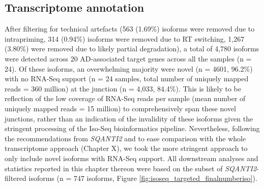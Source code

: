 
\clearpage
\subsection{Transcriptome annotation}
After filtering for technical artefacts (563 (1.69\%) isoforms were removed due to intrapriming, 314 (0.94\%) isoforms were removed due to RT switching, 1,267 (3.80\%) were removed due to likely partial degradation), a total of 4,780 isoforms were detected across 20 AD-associated target genes across all the samples (n = 24). Of these isoforms, an overwhelming majority were novel (n = 4601, 96.2\%) with no RNA-Seq support (n = 24 samples, total number of uniquely mapped reads = 360 million) at the junction (n = 4,033, 84.4\%). This is likely to be reflection of the low coverage of RNA-Seq reads per sample  (mean number of uniquely mapped reads = 15 million) to comprehensively span these novel junctions, rather than an indication of the invalidity of these isoforms given the stringent processing of the Iso-Seq bioinformatics pipeline. Nevertheless, following the recommendations from \textit{SQANTI2} and to ease comparison with the whole transcriptome approach (Chapter X), we took the more stringent approach to only include novel isoforms with RNA-Seq support. All downstream analyses and statistics reported in this chapter thereon were based on the subset of \textit{SQANTI2}-filtered isoforms (n = 747 isoforms, Figure \ref{fig:isoseq_targeted_finalnumberiso}).


